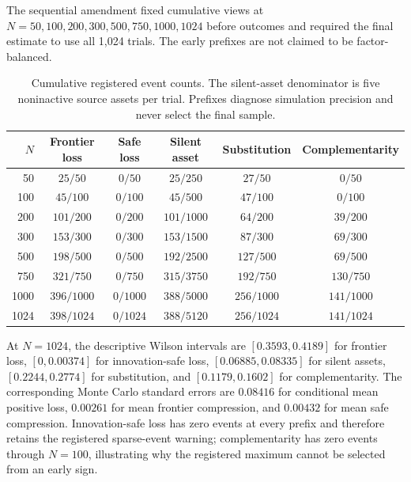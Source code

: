 The sequential amendment fixed cumulative views at
\(N=50,100,200,300,500,750,1000,1024\) before outcomes and required the final
estimate to use all 1,024 trials.  The early prefixes are not claimed to be
factor-balanced.

\begin{table}[htbp]
\centering
\scriptsize
\setlength{\tabcolsep}{3pt}
\begin{tabular}{@{}rccccc@{}}
\toprule
\(N\) & Frontier loss & Safe loss & Silent asset &
Substitution & Complementarity\\
\midrule
50   & \(25/50\)   & \(0/50\)   & \(25/250\)   & \(27/50\)    & \(0/50\)\\
100  & \(45/100\)  & \(0/100\)  & \(45/500\)   & \(47/100\)   & \(0/100\)\\
200  & \(101/200\) & \(0/200\)  & \(101/1000\) & \(64/200\)   & \(39/200\)\\
300  & \(153/300\) & \(0/300\)  & \(153/1500\) & \(87/300\)   & \(69/300\)\\
500  & \(198/500\) & \(0/500\)  & \(192/2500\) & \(127/500\)  & \(69/500\)\\
750  & \(321/750\) & \(0/750\)  & \(315/3750\) & \(192/750\)  & \(130/750\)\\
1000 & \(396/1000\)& \(0/1000\) & \(388/5000\) & \(256/1000\) & \(141/1000\)\\
1024 & \(398/1024\)& \(0/1024\) & \(388/5120\) & \(256/1024\) & \(141/1024\)\\
\bottomrule
\end{tabular}
\caption{Cumulative registered event counts.  The silent-asset denominator is
five noninactive source assets per trial.  Prefixes diagnose simulation
precision and never select the final sample.}
\label{tab:supp-randomized-v2-stability-events}
\end{table}

At \(N=1024\), the descriptive Wilson intervals are
\([0.3593,0.4189]\) for frontier loss, \([0,0.00374]\) for innovation-safe
loss, \([0.06885,0.08335]\) for silent assets, \([0.2244,0.2774]\) for
substitution, and \([0.1179,0.1602]\) for complementarity.  The corresponding
Monte Carlo standard errors are \(0.08416\) for conditional mean positive
loss, \(0.00261\) for mean frontier compression, and \(0.00432\) for mean safe
compression.  Innovation-safe loss has zero events at every prefix and
therefore retains the registered sparse-event warning; complementarity has
zero events through \(N=100\), illustrating why the registered maximum cannot
be selected from an early sign.

